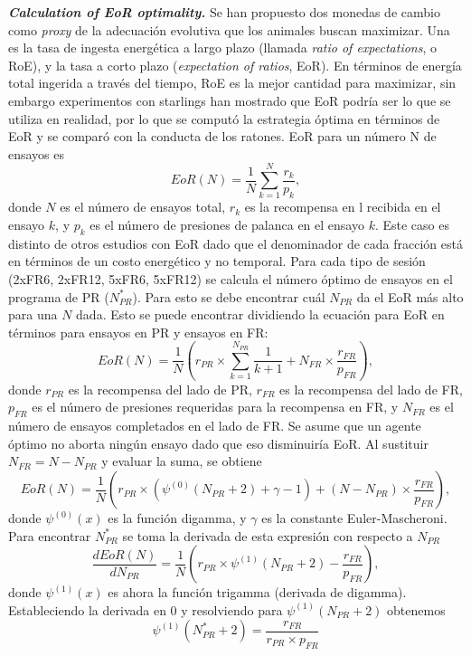 \documentclass[a4paper,12pt]{article}
\begin{document}
{\itshape\bfseries Calculation of EoR optimality.} Se han propuesto dos monedas de cambio como {\itshape proxy} de la adecuación evolutiva que los animales buscan maximizar. Una es la tasa de ingesta energética a largo plazo (llamada {\itshape ratio of expectations}, o RoE), y la tasa a corto plazo ({\itshape expectation of ratios}, EoR). En términos de energía total ingerida a través del tiempo, RoE es la mejor cantidad para maximizar, sin embargo experimentos con starlings han mostrado que EoR podría ser lo que se utiliza en realidad, por lo que se computó la estrategia óptima en términos de EoR y se comparó con la conducta de los ratones. EoR para un número N de ensayos es
$$
EoR(N) = \frac{1}{N}\sum_{k=1}^N \frac{r_k}{p_k},
$$
donde $N$ es el número de ensayos total, $r_k$ es la recompensa en \textmu l recibida en el ensayo $k$, y $p_k$ es el número de presiones de palanca en el ensayo $k$. Este caso es distinto de otros estudios con EoR dado que el denominador de cada fracción está en términos de un costo energético y no temporal. Para cada tipo de sesión (2xFR6, 2xFR12, 5xFR6, 5xFR12) se calcula el número óptimo de ensayos en el programa de PR ($N_{PR}^*$). Para esto se debe encontrar cuál $N_{PR}$ da el EoR más alto para una $N$ dada. Esto se puede encontrar dividiendo la ecuación para EoR en términos para ensayos en PR y ensayos en FR:
$$
EoR(N) = \frac{1}{N} 
\left(
	r_{PR} 
	\times 
	\sum_{k=1}^{N_{PR}}
	\frac{1}{k+1}
	+
	N_{FR}
	\times
	\frac{r_{FR}}{p_{FR}}
\right),
$$
donde $r_{PR}$ es la recompensa del lado de PR, $r_{FR}$ es la recompensa del lado de FR, $p_{FR}$ es el número de presiones requeridas para la recompensa en FR, y $N_{FR}$ es el número de ensayos completados en el lado de FR. Se asume que un agente óptimo no aborta ningún ensayo dado que eso disminuiría EoR. Al sustituir $N_{FR} = N - N_{PR}$ y evaluar la suma, se obtiene
$$
EoR(N)=
\frac{1}{N}
\left(
	r_{PR}
	\times
	\left(
		\psi^{(0)}
		(N_{PR} + 2) + \gamma -1
	\right)
	+
	(N - N_{PR})
	\times
	\frac{r_{FR}}{p_{FR}}
\right),
$$
donde $\psi^{(0)}(x)$ es la función digamma, y $\gamma$ es la constante Euler-Mascheroni. Para encontrar $N_{PR}^*$ se toma la derivada de esta expresión con respecto a $N_{PR}$
$$
\frac{
	dEoR(N)
}{
dN_{PR}
}
=
\frac{1}{N}
\left(
	r_{PR}
	\times 
	\psi^{(1)}
	(N_{PR} + 2)
	-
	\frac{r_{FR}}{p_{FR}}
\right),
$$
donde $\psi^{(1)}(x)$ es ahora la función trigamma (derivada de digamma). Estableciendo la derivada en 0 y resolviendo para $\psi^{(1)} (N_{PR} + 2)$ obtenemos
$$
\psi^{(1)}
(N_{PR}^* + 2)
=
\frac{
	r_{FR}
}{
r_{PR}
\times
p_{FR}
}
$$
\end{document}
